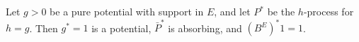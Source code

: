 Let $g > 0$ be a pure potential with support in $E$, and let $P^*$ be the $h$-process for $h = g$. Then $g^* = 1$ is a potential, $\bar{P}^*$ is absorbing, and $(B^E)^*1 = 1$.
